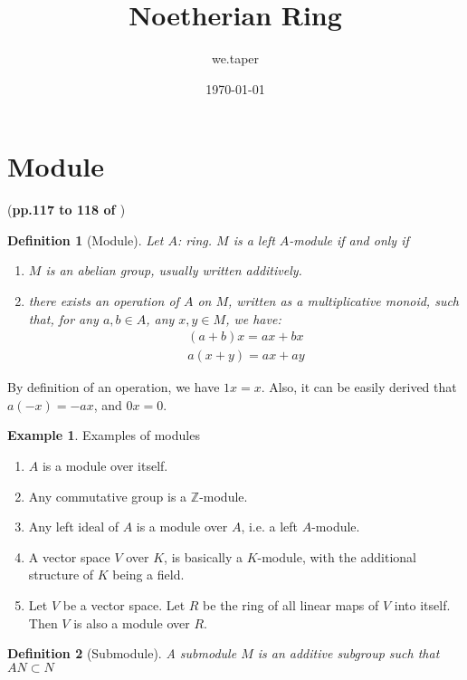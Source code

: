 \documentclass{article}
\title{Noetherian Ring}
\date{\today}
\author{we.taper}
\numberwithin{equation}{subsection} %
\newtheorem{defi}{Definition}[section]
\theoremstyle{definition}
\newtheorem{ex}{Example}[section]
\begin{document}
\maketitle
{}
\tableofcontents

\section{Module}
\label{sec:Module}
(\textbf{pp.117 to 118 of \cite{lang}})
\begin{defi}[Module]
Let $A$: ring. $M$ is a left $A$-module if and only if 
\begin{enumerate}
    \item $M$ is an abelian group, usually written additively.
    \item there exists an operation of $A$ on $M$, written as a
        multiplicative monoid, such that, for any $a,b\in A$, any
        $x,y \in M$, we have:
        \begin{align}
            (a+b) x = ax + bx\\
            a(x+y) = ax + ay
        \end{align}
\end{enumerate}
\end{defi}

By definition of an operation, we have $1x = x$. Also, it can be easily
derived that $a(-x) = -ax$, and $0x=0$.

\begin{ex}{Examples of modules}
    \begin{enumerate}
        \item $A$ is a module over itself.
        \item Any commutative group is a $\mathbb{Z}$-module.
        \item Any left ideal of $A$ is a module over $A$, i.e. a left
            $A$-module.
        \item A vector space $V$ over $K$, is basically a $K$-module,
            with the additional structure of $K$ being a field.
        \item Let $V$ be a vector space. 
            Let $R$ be the ring of all linear maps of $V$ into itself.
            Then $V$ is also a module over $R$.
    \end{enumerate}
\end{ex}

\begin{defi}[Submodule]
    A submodule $M$ is an additive subgroup such that 
    $AN\subset N$
\end{defi}
\end{document}
